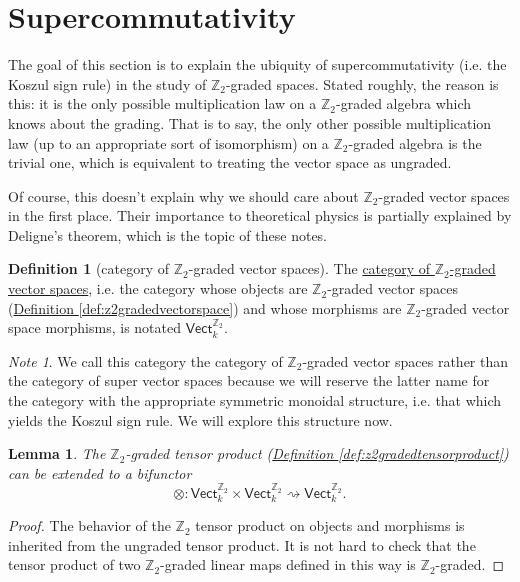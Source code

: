 \documentclass[a4paper,10pt]{scrreprt}
\newcommand{\Z}{\mathbb{Z}}
\newcommand{\defn}[1]{\ul{#1}}
\theoremstyle{definition}
\newtheorem{definition}{Definition}[section]
\theoremstyle{plain}
\newtheorem{lemma}{Lemma}[section]
\theoremstyle{remark}
\newtheorem{note}{Note}[section]
\begin{document}
\section{Supercommutativity}
The goal of this section is to explain the ubiquity of supercommutativity (i.e. the Koszul sign rule) in the study of $\Z_{2}$-graded spaces. Stated roughly, the reason is this: it is the only possible multiplication law on a $\Z_{2}$-graded algebra which knows about the grading. That is to say, the only other possible multiplication law (up to an appropriate sort of isomorphism) on a $\Z_{2}$-graded algebra is the trivial one, which is equivalent to treating the vector space as ungraded. 

Of course, this doesn't explain why we should care about $\Z_{2}$-graded vector spaces in the first place. Their importance to theoretical physics is partially explained by Deligne's theorem, which is the topic of these notes.

\begin{definition}[category of $\Z_{2}$-graded vector spaces]
  \label{def:categoryofz2gradedvectorspaces}
  The \defn{category of $\Z_{2}$-graded vector spaces}, i.e. the category whose objects are $\Z_{2}$-graded vector spaces (\hyperref[def:z2gradedvectorspace]{Definition \ref*{def:z2gradedvectorspace}}) and whose morphisms are $\Z_{2}$-graded vector space morphisms, is notated $\mathsf{Vect}_{k}^{\Z_{2}}$.
\end{definition}

\begin{note}
  We call this category the category of $\Z_{2}$-graded vector spaces rather than the category of super vector spaces because we will reserve the latter name for the category with the appropriate symmetric monoidal structure, i.e. that which yields the Koszul sign rule. We will explore this structure now.
\end{note}

\begin{lemma}
  The $\Z_{2}$-graded tensor product (\hyperref[def:z2gradedtensorproduct]{Definition \ref*{def:z2gradedtensorproduct}}) can be extended to a bifunctor 
  \begin{equation*}
    \otimes\colon \mathsf{Vect}_k^{\Z_{2}} \times \mathsf{Vect}_k^{\Z_{2}} \rightsquigarrow \mathsf{Vect}_k^{\Z_{2}}.
  \end{equation*}
\end{lemma}
\begin{proof}
  The behavior of the $\Z_{2}$ tensor product on objects and morphisms is inherited from the ungraded tensor product. It is not hard to check that the tensor product of two $\Z_{2}$-graded linear maps defined in this way is $\Z_{2}$-graded.
\end{proof}
\end{document}
